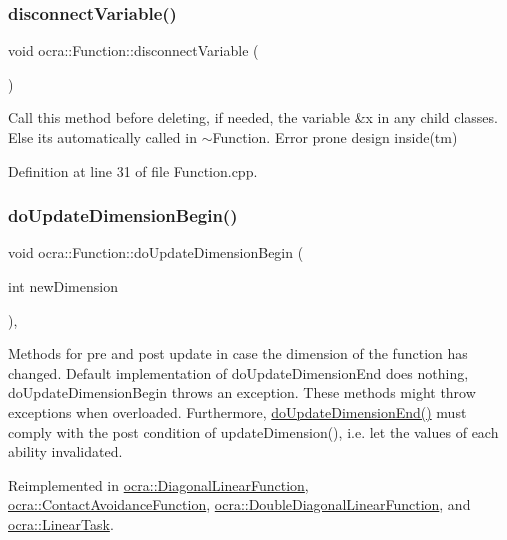 \subsubsection{\texorpdfstring{disconnect\+Variable()}{disconnectVariable()}}
{\footnotesize\ttfamily void ocra\+::\+Function\+::disconnect\+Variable (\begin{DoxyParamCaption}{ }\end{DoxyParamCaption})\hspace{0.3cm}{\ttfamily [protected]}}

Call this method before deleting, if needed, the variable \&x in any child classes. Else it\textquotesingle{}s automatically called in $\sim$\+Function. Error prone design inside(tm) 

Definition at line 31 of file Function.\+cpp.

\hypertarget{classocra_1_1Function_afdf98e9f43fde97a5256af88a50cbb39}{}\label{classocra_1_1Function_afdf98e9f43fde97a5256af88a50cbb39} 
\subsubsection{\texorpdfstring{do\+Update\+Dimension\+Begin()}{doUpdateDimensionBegin()}}
{\footnotesize\ttfamily void ocra\+::\+Function\+::do\+Update\+Dimension\+Begin (\begin{DoxyParamCaption}\item[{int}]{new\+Dimension }\end{DoxyParamCaption})\hspace{0.3cm}{\ttfamily [protected]}, {\ttfamily [virtual]}}

Methods for pre and post update in case the dimension of the function has changed. Default implementation of do\+Update\+Dimension\+End does nothing, do\+Update\+Dimension\+Begin throws an exception. These methods might throw exceptions when overloaded. Furthermore, {\ttfamily \hyperlink{classocra_1_1Function_a17aa280f0e6eff4a7569edc373a5147d}{do\+Update\+Dimension\+End()}} must comply with the post condition of {\ttfamily update\+Dimension()}, i.\+e. let the values of each ability invalidated. 

Reimplemented in \hyperlink{classocra_1_1DiagonalLinearFunction_a86b326e3578c8405806eab4ec6522ab2}{ocra\+::\+Diagonal\+Linear\+Function}, \hyperlink{classocra_1_1ContactAvoidanceFunction_a4f33ca5589b08a96207be800b9f4bd57}{ocra\+::\+Contact\+Avoidance\+Function}, \hyperlink{classocra_1_1DoubleDiagonalLinearFunction_af834599e9b414f8778e0618efc552661}{ocra\+::\+Double\+Diagonal\+Linear\+Function}, and \hyperlink{classocra_1_1LinearTask_a31c1140426b2f327e6a126fd917b04cd}{ocra\+::\+Linear\+Task}.



